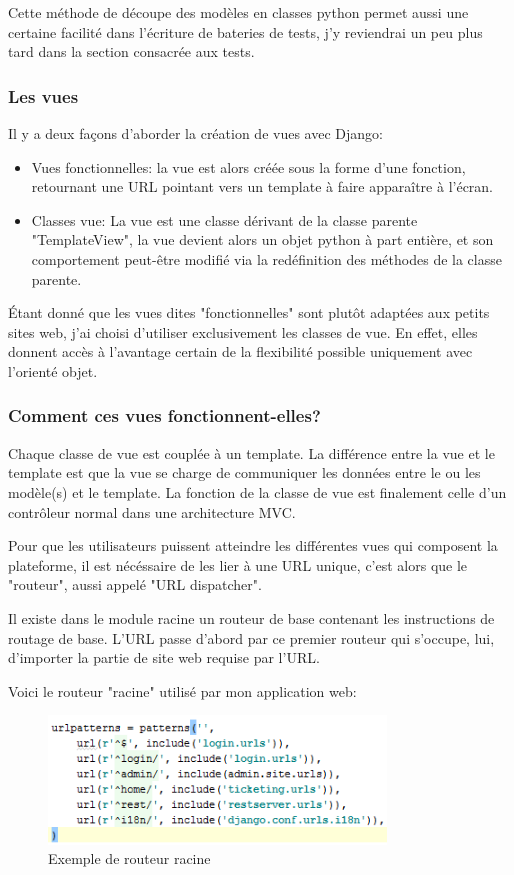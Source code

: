 \documentclass[12pt,table,a4paper]{report}
\begin{document}
Cette méthode de découpe des modèles en classes python permet aussi une certaine facilité dans l'écriture de bateries de tests, j'y reviendrai un peu plus tard dans la section consacrée aux tests.

\subsubsection{Les vues}
Il y a deux façons d'aborder la création de vues avec Django:

\begin{itemize}
	\item{Vues fonctionnelles: la vue est alors créée sous la forme d'une fonction, retournant une URL pointant vers un template à faire apparaître à l'écran.}
	\item{Classes vue: La vue est une classe dérivant de la classe parente "TemplateView", la vue devient alors un objet python à part entière, et son comportement peut-être modifié via la redéfinition des méthodes de la classe parente.}
\end{itemize}

Étant donné que les vues dites "fonctionnelles" sont plutôt adaptées aux petits sites web, j'ai choisi d'utiliser exclusivement les classes de vue. En effet, elles donnent accès à l'avantage certain de la flexibilité possible uniquement avec l'orienté objet.

\subsubsection{Comment ces vues fonctionnent-elles?}

Chaque classe de vue est couplée à un template. La différence entre la vue et le template est que la vue se charge de communiquer les données entre le ou les modèle(s) et le template. La fonction de la classe de vue est finalement celle d'un contrôleur normal dans une architecture MVC.

Pour que les utilisateurs puissent atteindre les différentes vues qui composent la plateforme, il est nécéssaire de les lier à une URL unique, c'est alors que le "routeur", aussi appelé "URL dispatcher".

Il existe dans le module racine un routeur de base contenant les instructions de routage de base. L'URL passe d'abord par ce premier routeur qui s'occupe, lui, d'importer la partie de site web requise par l'URL.

Voici le routeur "racine" utilisé par mon application web:
\begin{figure}
	\centering
		\includegraphics[width=0.8\textwidth,natwidth=377,natheight=144]{images/ticket-routeur-racine.png}
	\caption{Exemple de routeur racine}
	\label{fig:ticket-routeur-racine}
\end{figure}
\end{document}
